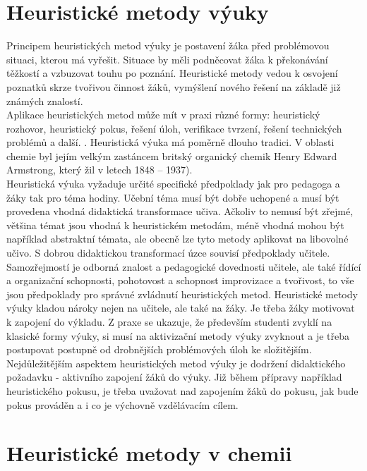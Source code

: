 
\chapter{Heuristické metody výuky}

Principem heuristických metod výuky je postavení žáka před problémovou situaci, kterou má vyřešit.
Situace by měli podněcovat žáka k překonávání těžkostí a vzbuzovat touhu po poznání. 
Heuristické metody vedou k osvojení poznatků skrze tvořivou činnost žáků, vymýšlení nového řešení na 
základě již známých znalostí.\cite{vanecek2016,zormanova2012}\\

Aplikace heuristických metod může mít v praxi různé formy: heuristický rozhovor, heuristický pokus, 
řešení úloh, verifikace tvrzení, řešení technických problémů a další. \cite{vanecek2016}. Heuristická 
výuka má poměrně dlouho tradici. V oblasti chemie byl jejím velkým zastáncem britský organický chemik 
Henry Edward Armstrong, který žil v letech  1848 -- 1937).\cite{armstrong_britannica, armstrong_heuristic_method} \\

Heuristická výuka vyžaduje určité specifické předpoklady jak pro pedagoga a žáky tak pro téma hodiny. 
Učební téma musí být dobře uchopené a musí být provedena vhodná didaktická transformace učiva. Ačkoliv 
to nemusí být zřejmé, většina témat jsou vhodná k heuristickém metodám, méně vhodná mohou být například 
abstraktní témata, ale obecně lze tyto metody aplikovat na libovolné učivo. \cite{kropac2006, zieleniecova2012} 
S dobrou didaktickou transformací úzce souvisí předpoklady učitele. Samozřejmostí je odborná znalost a pedagogické dovednosti učitele, ale také řídící a organizační schopnosti, pohotovost a schopnost improvizace a tvořivost, to vše jsou předpoklady pro správné zvládnutí heuristických metod.
Heuristické metody výuky kladou nároky nejen na učitele, ale také na žáky. Je třeba žáky motivovat k zapojení do výkladu. Z praxe se ukazuje, že především studenti zvyklí na klasické formy výuky, si musí na aktivizační metody výuky zvyknout a je třeba postupovat postupně od drobnějších problémových úloh ke složitějším. \cite{zieleniecova2012} Nejdůležitějším aspektem heuristických metod výuky je dodržení didaktického požadavku - aktivního zapojení žáků do výuky. Již během přípravy například heuristického pokusu, je třeba uvažovat nad zapojením žáků do pokusu, jak bude pokus prováděn a i co je výchovně vzdělávacím cílem. \cite{vanecek2016}


\chapter{Heuristické metody v chemii}

